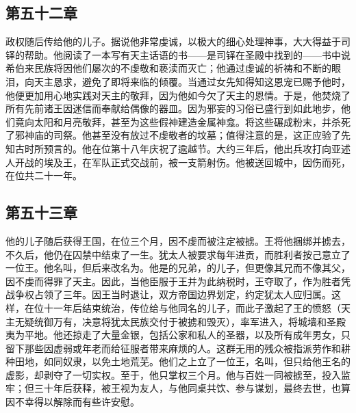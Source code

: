 
\subsection{第五十二章}

政权随后传给他的儿子。据说他非常虔诚，以极大的细心处理神事，大大得益于司铎的帮助。他阅读了一本写有天主话语的书——是司铎在圣殿中找到的——书中说希伯来民族将因他们屡次的不虔敬和亵渎而灭亡；他通过虔诚的祈祷和不断的眼泪，向天主恳求，避免了即将来临的倾覆。当通过女先知得知这恩宠已赐予他时，他便更加用心地实践对天主的敬拜，因为他如今欠了天主的恩情。于是，他焚烧了所有先前诸王因迷信而奉献给偶像的器皿。因为邪妄的习俗已盛行到如此地步，他们竟向太阳和月亮敬拜，甚至为这些假神建造金属神龛。将这些碾成粉末，并杀死了邪神庙的司祭。他甚至没有放过不虔敬者的坟墓；值得注意的是，这正应验了先知古时所预言的。他在位第十八年庆祝了逾越节。大约三年后，他出兵攻打向亚述人开战的埃及王，在军队正式交战前，被一支箭射伤。他被送回城中，因伤而死，在位共二十一年。\par


\subsection{第五十三章}

他的儿子随后获得王国，在位三个月，因不虔而被注定被掳。王将他捆绑并掳去，不久后，他仍在囚禁中结束了一生。犹太人被要求每年进贡，而胜利者按己意立了一位王。他名叫，但后来改名为。他是的兄弟，的儿子，但更像其兄而不像其父，因不虔而得罪了天主。因此，当他臣服于王并为此纳税时，王夺取了，作为胜者凭战争权占领了三年。因王当时退让，双方帝国边界划定，约定犹太人应归属。这样，在位十一年后结束统治，传位给与他同名的儿子，而此子激起了王的愤怒（天主无疑统御万有，决意将犹太民族交付于被掳和毁灭），率军进入，将城墙和圣殿夷为平地。他还掠走了大量金银，包括公家和私人的圣器，以及所有成年男女，只留下那些因虚弱或年老而给征服者带来麻烦的人。这群无用的残众被指派劳作和耕种田地，如同奴隶，以免土地荒芜。他们之上立了一位王，名叫，但只给他王名的虚影，却剥夺了一切实权。至于，他只掌权三个月。他与百姓一同被掳至，投入监牢；但三十年后获释，被王视为友人，与他同桌共饮、参与谋划，最终去世，也算因不幸得以解除而有些许安慰。\par

